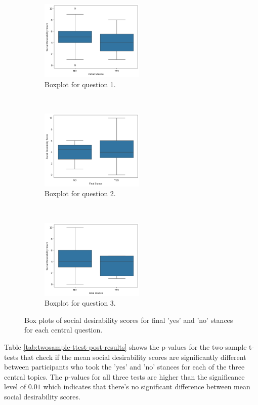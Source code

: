 \documentclass{scrartcl}
\begin{document}
\begin{figure}[t!]
    \centering
    \begin{subfigure}[t]{0.3\textwidth}
        \centering
        \includegraphics[height=1.5in]{fig/social_desirability_topic_33.png}
        \caption{Boxplot for question 1.}
        \label{graph:social-desirability-post-1}
    \end{subfigure}%
    ~
    \begin{subfigure}[t]{0.3\textwidth}
        \centering
        \includegraphics[height=1.5in]{fig/post_social_desirability_48.png}
        \caption{Boxplot for question 2.}
        \label{graph:social-desirability-post-2}
    \end{subfigure}%
    ~
    \begin{subfigure}[t]{0.3\textwidth}
        \centering
        \includegraphics[height=1.5in]{fig/post_social_desirability_73.png}
        \caption{Boxplot for question 3.}
        \label{graph:social-desirability-post-3}
    \end{subfigure}%
    \caption{Box plots of social desirability scores for final 'yes' and 'no' stances for each central question.}
    \label{graph:social-desirability-post-all}
\end{figure}

Table \ref{tab:twosample-ttest-post-results} shows the p-values for the two-sample t-tests that check if the mean social desirability scores are significantly different between participants who took the 'yes' and 'no' stances for each of the three central topics. The p-values for all three tests are higher than the significance level of $0.01$ which indicates that there's no significant difference between mean social desirability scores.
\end{document}
